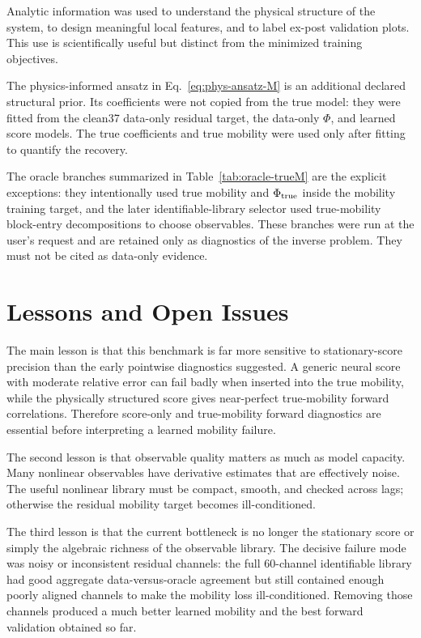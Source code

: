 \documentclass[11pt]{article}
\begin{document}
Analytic information was used to understand the physical structure of the
system, to design meaningful local features, and to label ex-post validation
plots.  This use is scientifically useful but distinct from the minimized
training objectives.

The physics-informed ansatz in Eq.~\eqref{eq:phys-ansatz-M} is an additional
declared structural prior.  Its coefficients were not copied from the true
model: they were fitted from the clean37 data-only residual target, the
data-only \(\Phi\), and learned score models.  The true coefficients and true
mobility were used only after fitting to quantify the recovery.

The oracle branches summarized in Table~\ref{tab:oracle-trueM} are the explicit
exceptions: they intentionally used true mobility and \(\Phi_{\rm true}\) inside
the mobility training target, and the later identifiable-library selector used
true-mobility block-entry decompositions to choose observables.  These branches
were run at the user's request and are retained only as diagnostics of the
inverse problem.  They must not be cited as data-only evidence.

\section{Lessons and Open Issues}

The main lesson is that this benchmark is far more sensitive to stationary-score
precision than the early pointwise diagnostics suggested.  A generic neural
score with moderate relative error can fail badly when inserted into the true
mobility, while the physically structured score gives near-perfect true-mobility
forward correlations.  Therefore score-only and true-mobility forward
diagnostics are essential before interpreting a learned mobility failure.

The second lesson is that observable quality matters as much as model capacity.
Many nonlinear observables have derivative estimates that are effectively noise.
The useful nonlinear library must be compact, smooth, and checked across lags;
otherwise the residual mobility target becomes ill-conditioned.

The third lesson is that the current bottleneck is no longer the stationary
score or simply the algebraic richness of the observable library.  The decisive
failure mode was noisy or inconsistent residual channels: the full
60-channel identifiable library had good aggregate data-versus-oracle agreement
but still contained enough poorly aligned channels to make the mobility loss
ill-conditioned.  Removing those channels produced a much better learned
mobility and the best forward validation obtained so far.
\end{document}
